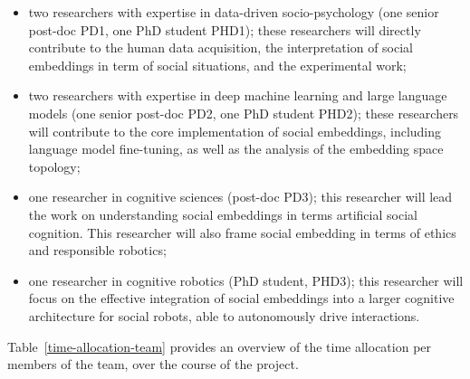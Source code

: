 \begin{itemize}

    \item  two researchers with expertise in data-driven
        socio-psychology (one senior post-doc PD1, one PhD student PHD1); these
        researchers will directly contribute to the human data acquisition,
        the interpretation of social embeddings in term of social situations,
        and the experimental work;

    \item two researchers with expertise in deep machine learning and large
        language models (one senior post-doc PD2, one PhD student PHD2); these
        researchers will contribute to the core implementation of social
        embeddings, including language model fine-tuning, as well as the
        analysis of the embedding space topology;

    \item one researcher in cognitive sciences (post-doc PD3); this researcher
        will lead the work on understanding social embeddings in terms
        artificial social cognition. This researcher will also frame social
        embedding in terms of ethics and responsible robotics;

    \item one researcher in cognitive robotics (PhD student, PHD3); this
        researcher will focus on the effective integration of social
        embeddings into a larger cognitive architecture for social robots, able
        to autonomously drive interactions.
\end{itemize}

Table~\ref{time-allocation-team} provides an overview of the time allocation per
members of the team, over the course of the project.

